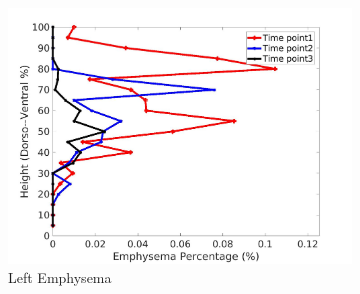 \begin{figure}[H]
\begin{subfigure}{.42\linewidth}
  \includegraphics[width=\linewidth,trim={{.0\wd0} {.0\wd0} {.0\wd0} {.0\wd0}},clip]{Appendix/Image_AppexA/DorsoToVentral/IPF3LeftLungEmphysemaDiseaseDorsoToVentral.jpg} %
  \caption{Left Emphysema}
  \label{fig:IPF3DiseaseDorsoToVentral-g} 
\end{subfigure} 
\begin{subfigure}{.42\linewidth}%

\end{subfigure}
\end{figure}

